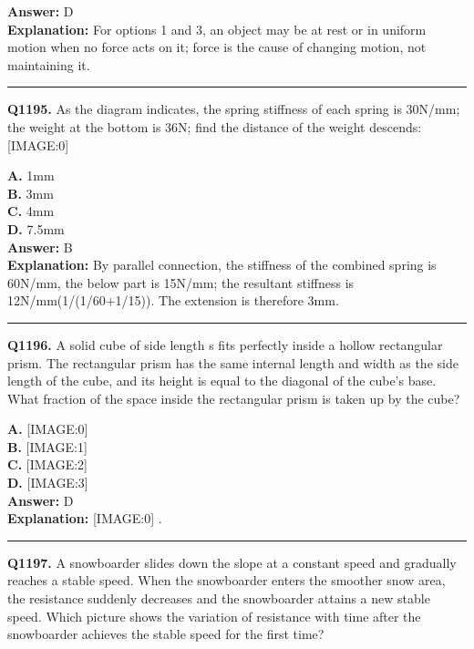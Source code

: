\documentclass[12pt]{article}
\begin{document}
\textbf{Answer:} D \\
\textbf{Explanation:} For options 1 and 3, an object may be at rest or in uniform motion when no force acts on it; force is the cause of changing motion, not maintaining it.

\hrule
\vspace{1em}


\noindent
\textbf{Q1195.} As the diagram indicates, the spring stiffness of each spring is 30N/mm; the weight at the bottom is 36N; find the distance of the weight descends:
[IMAGE:0]



\textbf{A.} 1mm \\
\textbf{B.} 3mm \\
\textbf{C.} 4mm \\
\textbf{D.} 7.5mm \\

\textbf{Answer:} B \\
\textbf{Explanation:} By parallel connection, the stiffness of the combined spring is 60N/mm, the below part is 15N/mm; the resultant stiffness is 12N/mm(1/(1/60+1/15)). The extension is therefore 3mm.

\hrule
\vspace{1em}


\noindent
\textbf{Q1196.} A solid cube of side length s fits perfectly inside a hollow rectangular prism. The rectangular prism has the same internal length and width as the side length of the cube, and its height is equal to the diagonal of the cube's base. What fraction of the space inside the rectangular prism is taken up by the cube?



\textbf{A.} [IMAGE:0] \\
\textbf{B.} [IMAGE:1] \\
\textbf{C.} [IMAGE:2] \\
\textbf{D.} [IMAGE:3] \\

\textbf{Answer:} D \\
\textbf{Explanation:} [IMAGE:0]
.

\hrule
\vspace{1em}


\noindent
\textbf{Q1197.} A snowboarder slides down the slope at a constant speed and gradually reaches a stable speed. When the snowboarder enters the smoother snow area, the resistance suddenly decreases and the snowboarder attains a new stable speed. Which picture shows the variation of resistance with time after the snowboarder achieves the stable speed for the first time?
\end{document}
